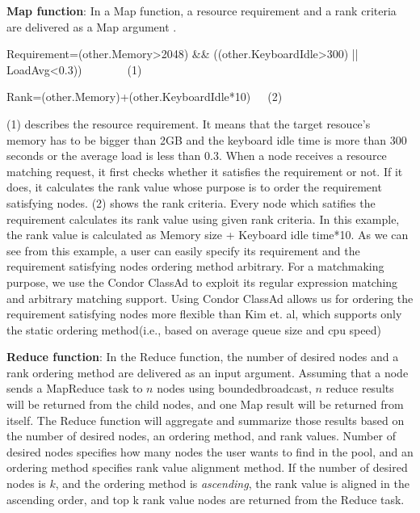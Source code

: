 \documentclass{acm_proc_article-sp}
\begin{document}
\textbf{Map function}: In a Map function, a resource requirement and a rank criteria are delivered as a Map argument .
\begin{flushleft}Requirement=(other.Memory>2048) \&\& ((other.KeyboardIdle>300) || LoadAvg<0.3))\ \ \ \ \ \ \ \ (1)\end{flushleft}
\begin{flushleft}Rank=(other.Memory)+(other.KeyboardIdle*10)\ \ \ (2)\end{flushleft}
(1) describes the resource requirement. It means that the target resouce's memory has to be bigger than 2GB and the keyboard idle time is more than 300 seconds or the average load is less than 0.3.
When a node receives a resource matching request, it first checks whether it satisfies the requirement or not. If it does, it calculates the rank value whose purpose is to order the requirement satisfying nodes.
(2) shows the rank criteria. Every node which satifies the requirement calculates its rank value using given rank criteria. In this example, the rank value is calculated as Memory size + Keyboard idle time*10.
As we can see from this example, a user can easily specify its requirement and the requirement satisfying nodes ordering method arbitrary.
For a matchmaking purpose, we use the Condor ClassAd\cite{classad} to exploit its regular expression matching and arbitrary matching support.
Using Condor ClassAd allows us for ordering the requirement satisfying nodes more flexible than Kim et. al\cite{can_query}, which supports only the static ordering method(i.e., based on average queue size and cpu speed)

\textbf{Reduce function}: In the Reduce function, the number of desired nodes and a rank ordering method are delivered as an input argument.
Assuming that a node sends a MapReduce task to $n$ nodes using boundedbroadcast, \begin{math}n\end{math} reduce results will be returned from the child nodes, 
and one Map result will be returned from itself. The Reduce function will aggregate and summarize those results based on the number of desired nodes, an ordering method, and rank values. 
Number of desired nodes specifies how many nodes the user wants to find in the pool, and an ordering method specifies rank value alignment method. 
If the number of desired nodes is $k$, and the ordering method is \textit{ascending}, the rank value is aligned in the ascending order, and top k rank value nodes are returned from the Reduce task.
\end{document}
